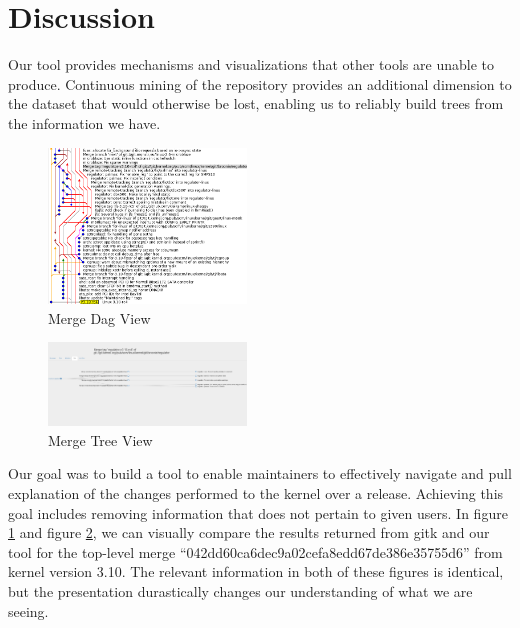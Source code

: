 \documentclass[conference, draftclsnofoot]{IEEEtran}
\begin{document}

\section{Discussion}

Our tool provides mechanisms and visualizations that other tools are unable to
produce. Continuous mining of the repository provides an additional dimension
to the dataset that would otherwise be lost, enabling us to reliably build
trees from the information we have.

\begin{figure}[h]
	\centering
	\includegraphics[width=0.47\textwidth]{figures/042dd_DAG.png}
	\caption{Merge Dag View}
	\label{fig:dag_view}
\end{figure}

\begin{figure}[h]
	\centering
	\includegraphics[width=0.47\textwidth]{figures/042dd_tree.png}
	\caption{Merge Tree View}
	\label{fig:tree_view}
\end{figure}

Our goal was to build a tool to enable maintainers to effectively navigate and
pull explanation of the changes performed to the kernel over a release.
Achieving this goal includes removing information that does not pertain to given
users. In figure \ref{fig:dag_view} and figure \ref{fig:tree_view}, we can
visually compare the results returned from gitk and our tool for the top-level
merge ``042dd60ca6dec9a02cefa8edd67de386e35755d6'' from kernel version 3.10.
The relevant information in both of these figures is identical, but the
presentation durastically changes our understanding of what we are seeing.
\end{document}
